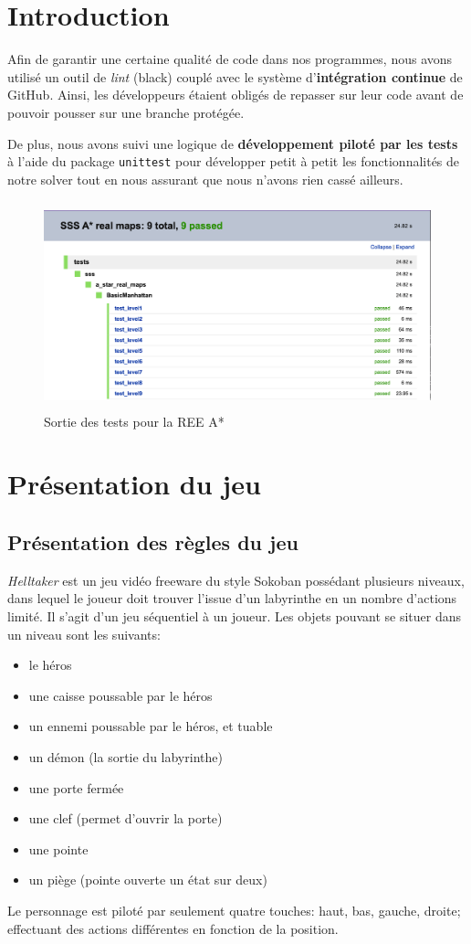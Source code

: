 \section*{Introduction}
Afin de garantir une certaine qualité de code dans nos programmes, nous avons utilisé un outil de \textit{lint} (black) couplé avec le système d'\textbf{intégration continue} de GitHub. Ainsi, les développeurs étaient obligés de repasser sur leur code avant de pouvoir pousser sur une branche protégée.

De plus, nous avons suivi une logique de \textbf{développement piloté par les tests} à l'aide du package \verb|unittest| pour développer petit à petit les fonctionnalités de notre solver tout en nous assurant que nous n'avons rien cassé ailleurs.


\begin{figure}[H]
	\centering
	\includegraphics[height=6cm]{figures/tests_long.png}
	\caption{Sortie des tests pour la REE A*}
\end{figure}


\section{Présentation du jeu}

\subsection{Présentation des règles du jeu}

\textit{Helltaker} est un jeu vidéo freeware du style Sokoban possédant plusieurs niveaux, dans lequel le joueur doit trouver l'issue d'un labyrinthe en un nombre d'actions limité. Il s'agit d'un jeu séquentiel à un joueur.
Les objets pouvant se situer dans un niveau sont les suivants:
\begin{itemize}
	\item le héros
	\item une caisse poussable par le héros
	\item un ennemi poussable par le héros, et tuable
	\item un démon (la sortie du labyrinthe)
	\item une porte fermée
	\item une clef (permet d'ouvrir la porte)
	\item une pointe
	\item un piège (pointe ouverte un état sur deux)
\end{itemize}
Le personnage est piloté par seulement quatre touches: haut, bas, gauche, droite; effectuant des actions différentes en fonction de la position.

